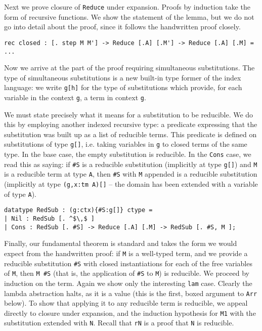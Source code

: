 \documentclass{article}
\begin{document}
Next we prove closure of \lstinline{Reduce} under expansion. Proofs
by induction take the form of recursive functions. We show the
statement of the lemma, but we do not go into detail about the proof,
since it follows the handwritten proof closely.

\begin{lstlisting}
rec closed : [. step M M'] -> Reduce [.A] [.M'] -> Reduce [.A] [.M] = ...
\end{lstlisting}

Now we arrive at the part of the proof requiring simultaneous
substitutions. The type of simultaneous substitutions is a new built-in
type former of the index language: we write \lstinline{g[h]} for the
type of substitutions which provide, for each variable in the context
\lstinline{g}, a term in context \lstinline{g}.

We must state precisely what it means for a substitution to be
reducible. We do this by employing another indexed recursive type: a predicate
expressing that the substitution was built up as a list of reducible
terms. This predicate is defined on substitutions of type
\lstinline{g[]}, i.e. taking variables in \lstinline{g} to closed
terms of the same type. In the base case, the
empty substitution is reducible. In the \lstinline{Cons} case, we read
this as saying: if \lstinline{#S} is a reducible substitution
(implicitly at type \lstinline{g[]}) and \lstinline{M} is a reducible
term at type \lstinline{A}, then \lstinline{#S} with \lstinline{M}
appended is a reducible substitution (implicitly at type
\lstinline{(g,x:tm A)[]} -- the domain has been extended with a
variable of type \lstinline{A}).

\begin{lstlisting}
datatype RedSub : (g:ctx){#S:g[]} ctype =
| Nil : RedSub [. ^$\,$ ]
| Cons : RedSub [. #S] -> Reduce [.A] [.M] -> RedSub [. #S, M ];
\end{lstlisting}


Finally, our fundamental theorem is standard and takes the form we would expect
from the handwritten proof: if \lstinline{M} is a well-typed
term, and we provide a reducible substitution \lstinline{#S} with closed
instantiations for each of the free variables of \lstinline{M}, then
\lstinline{M #S} (that is, the application of \lstinline{#S} to
\lstinline{M}) is reducible. We proceed by induction on the
term. Again we show only the interesting \lstinline{lam} case. Clearly
the lambda abstraction halts, as it is a value (this is the first,
boxed argument to \lstinline{Arr} below). To show 
that applying it to any reducible term is reducible, we appeal directly to
closure under expansion, and the induction hypothesis for
\lstinline{M1} with the substitution extended with
\lstinline{N}. Recall that \lstinline{rN} is a proof that
\lstinline{N} is reducible.
\end{document}
